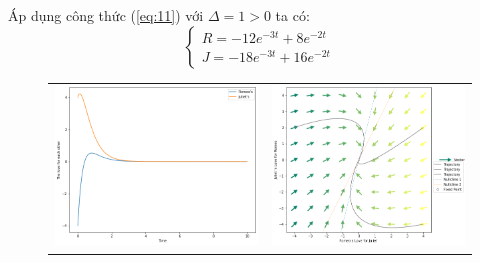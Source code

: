 \documentclass[a4paper]{article}
\begin{document}
\begin{enumerate}
\begin{itemize}
    Áp dụng công thức (\ref{eq:11}) với $\Delta = 1 > 0$ ta có:
    $$\begin{cases}
        R = -12e^{-3t} + 8e^{-2t} \\
        J = -18e^{-3t} + 16e^{-2t}
    \end{cases}$$
    \begin{figure}[htp]
        \centering
        \begin{tabular}{cc}
            \includegraphics[scale = .33]{Images/Bt2/9.2_gr.png} &
            \includegraphics[scale = .33]{Images/Bt2/9.2_phase.png} \\

\end{tabular}
\end{figure}
\end{itemize}
\end{enumerate}
\end{document}
